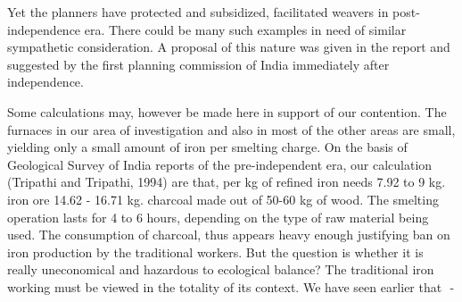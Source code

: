 Yet the planners have protected and subsidized, facilitated weavers in post-independence era. There could be many such examples in need of similar sympathetic consideration. A proposal of this nature was given in the report and suggested by the first planning commission of India immediately after independence.  

Some calculations may, however be made here in support of our contention. The furnaces in our area of investigation and also in most of the other areas are small, yielding only a small amount of iron per smelting charge. On the basis of Geological Survey of India reports of the pre-independent era, our calculation (Tripathi and Tripathi, 1994) are that, per kg of refined iron needs 7.92 to 9 kg. iron ore 14.62 - 16.71 kg. charcoal made out of 50-60 kg of wood. The smelting operation lasts for 4 to 6 hours, depending on the type of raw material being used. The consumption of charcoal, thus appears heavy enough justifying ban on iron production by the traditional workers. But the question is whether it is really uneconomical and hazardous to ecological balance? The traditional iron working must be viewed in the totality of its context. We have seen earlier that ­ -

